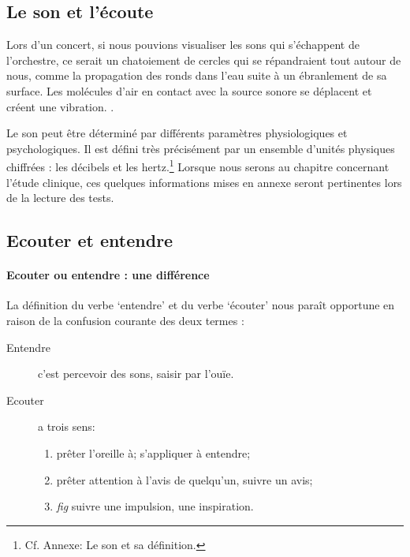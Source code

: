 

\subsection{Le son et l'écoute}

Lors d'un concert, si nous pouvions visualiser les sons qui
s'échappent de l'orchestre, ce serait un chatoiement de cercles qui se
répandraient tout autour de nous, comme 
la propagation des
ronds dans l'eau suite à un ébranlement de sa surface.
Les molécules d'air en contact avec la source sonore se déplacent et
créent une vibration. \autocite[p. 183]{bencivelli:pourquoi,}.


Le son peut être déterminé par différents paramètres
physiologiques et psychologiques.
Il est défini très précisément par un ensemble d'unités physiques chiffrées
: les décibels  et les hertz.\footnote{Cf. Annexe: Le son et sa
  définition.}
Lorsque nous serons au chapitre concernant l'étude clinique,
ces quelques informations mises en annexe seront pertinentes lors de la lecture des tests.




\subsection{Ecouter et entendre}
\paragraph{Ecouter ou entendre : une différence}

La définition du verbe `entendre' et du verbe `écouter' 
\autocite[pp. 361--385]{hachette:dictionnaire} nous paraît opportune
en raison de la confusion courante des deux termes :
\begin{description}
\item[Entendre] c'est  percevoir des sons, saisir par l'ouïe.
\item[Ecouter] a trois sens: 
\begin{enumerate}
	\item prêter l'oreille à; s'appliquer à entendre;
	\item prêter attention à l'avis de quelqu'un, suivre un avis;
	\item \emph{fig} suivre une impulsion,	une inspiration.
\end{enumerate}
\end{description}


